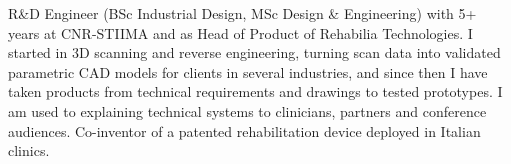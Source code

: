 {R\&D Engineer (BSc Industrial Design, MSc Design \& Engineering) with 5+ years at CNR-STIIMA and as Head of Product of Rehabilia Technologies. I started in 3D scanning and reverse engineering, turning scan data into validated parametric CAD models for clients in several industries, and since then I have taken products from technical requirements and drawings to tested prototypes. I am used to explaining technical systems to clinicians, partners and conference audiences. Co-inventor of a patented rehabilitation device deployed in Italian clinics.}
